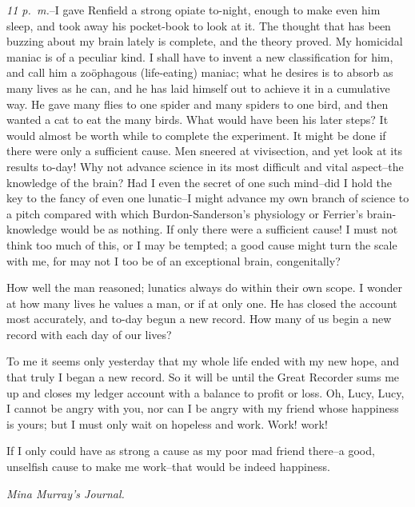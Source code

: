 \documentclass[12pt,openright]{book}
\begin{document}
\textit{11 p. m.}–I gave Renfield a strong opiate to-night, enough to make even him sleep, and took away his pocket-book to look at it. The thought that has been buzzing about my brain lately is complete, and the theory proved. My homicidal maniac is of a peculiar kind. I shall have to invent a new classification for him, and call him a zoöphagous (life-eating) maniac; what he desires is to absorb as many lives as he can, and he has laid himself out to achieve it in a cumulative way. He gave many flies to one spider and many spiders to one bird, and then wanted a cat to eat the many birds. What would have been his later steps? It would almost be worth while to complete the experiment. It might be done if there were only a sufficient cause. Men sneered at vivisection, and yet look at its results to-day! Why not advance science in its most difficult and vital aspect–the knowledge of the brain? Had I even the secret of one such mind–did I hold the key to the fancy of even one lunatic–I might advance my own branch of science to a pitch compared with which Burdon-Sanderson’s physiology or Ferrier’s brain-knowledge would be as nothing. If only there were a sufficient cause! I must not think too much of this, or I may be tempted; a good cause might turn the scale with me, for may not I too be of an exceptional brain, congenitally?

How well the man reasoned; lunatics always do within their own scope. I wonder at how many lives he values a man, or if at only one. He has closed the account most accurately, and to-day begun a new record. How many of us begin a new record with each day of our lives?

To me it seems only yesterday that my whole life ended with my new hope, and that truly I began a new record. So it will be until the Great Recorder sums me up and closes my ledger account with a balance to profit or loss. Oh, Lucy, Lucy, I cannot be angry with you, nor can I be angry with my friend whose happiness is yours; but I must only wait on hopeless and work. Work! work!

If I only could have as strong a cause as my poor mad friend there–a good, unselfish cause to make me work–that would be indeed happiness.

\textit{Mina Murray’s Journal.}
\end{document}
